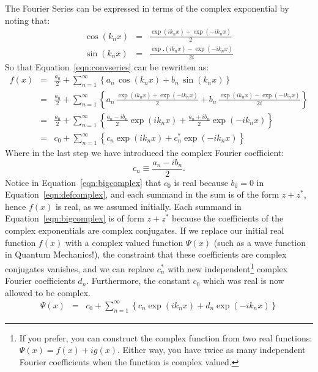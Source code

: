 \documentclass[12pt]{article}
\begin{document}
The Fourier Series can be expressed in terms of the complex exponential by noting that:
\begin{eqnarray*}
\cos(k_n x) &=& \frac{\exp(i k_n x) + \exp(-i k_n x)}{2} \\
\sin(k_n x) &=& \frac{\exp.(i k_n x) - \exp(-i k_n x)}{2i}
\end{eqnarray*}
So that Equation~\ref{eqn:convseries} can be rewritten as:
\begin{eqnarray}
f(x) &=& \frac{a_0}{2} + \sum_{n=1}^{\infty}  \left\{ a_n \, \cos(k_n x ) + b_n \, \sin( k_n x ) \right\} \nonumber \\
&=& \frac{a_0}{2}+ \sum_{n=1}^{\infty}  \left\{ a_n \,  \frac{\exp(i k_n x) + \exp(-i k_n x)}{2} 
+ b_n \, \frac{\exp(i k_n x) - \exp(-i k_n x)}{2i} \right\} \nonumber \\
&=& \frac{a_0}{2} + \sum_{n=1}^{\infty}  \left\{ \frac{a_n - i b_n}{2} \exp(i k_n x) + 
\frac{a_n + i b_n}{2} \exp(-i k_n x) \right\} \nonumber \\
&=& c_0 + \sum_{n=1}^{\infty}  \left\{ c_n \exp(i k_n x) + 
c_n^* \exp(-i k_n x) \right\}  \label{eqn:bigcomplex}
\end{eqnarray}
Where in the last step we have introduced the complex Fourier coefficient:
\begin{equation}
c_n \equiv \frac{a_n - i b_n}{2}. \label{eqn:defcomplex}
\end{equation}
Notice in Equation~\ref{eqn:bigcomplex} that $c_0$ is real because $b_0 = 0$ in Equation~\ref{eqn:defcomplex}, and each summand in the sum is of the form $z+z^*$, hence $f(x)$ is real, as we assumed initially.  Each summand in Equation~\ref{eqn:bigcomplex} is of form $z+z^*$ because the coefficients of the complex exponentials are complex conjugates.  If we replace our initial real function $f(x) $ with a complex valued function $\Psi(x)$ (such as a wave function in Quantum Mechanics!), the constraint that these coefficients are complex conjugates vanishes, and we can replace $c_n^*$ with new independent\footnote{If you prefer, you can construct the complex function from two real functions:  $\Psi(x) = f(x) + i g(x)$.  Either way, you have twice as many independent Fourier coefficients when the function is complex valued.} complex Fourier coefficients $d_n$.   Furthermore, the constant $c_0$ which was real is now allowed to be complex.
\begin{eqnarray*}
\Psi(x)  &=& c_0 + \sum_{n=1}^{\infty}  \left\{ c_n \exp(i k_n x) + 
d_n \exp(-i k_n x) \right\} 
\end{eqnarray*}
\end{document}
